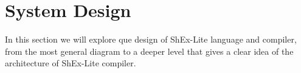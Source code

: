 \setchapterpreamble[u]{\margintoc}
\chapter{System Design}

In this section we will explore que design of ShEx-Lite language and compiler,
from the most general diagram to a deeper level that gives a clear idea of the
architecture of ShEx-Lite compiler.


